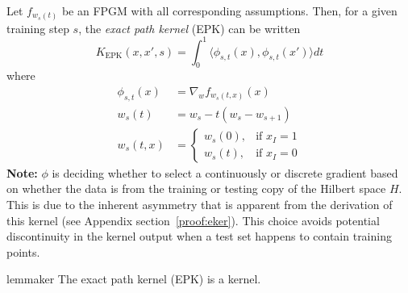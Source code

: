 \begin{definition}
\label{epk}

Let $f_{w_s(t)}$ be an FPGM with all corresponding assumptions. Then, for a given training step $s$, the \emph{exact path kernel} (EPK) can be written  
\begin{equation}
 K_{\text{EPK}}(x, x', s) = \int_0^1\langle \phi_{s,t}(x), \phi_{s,t}(x')\rangle dt
 \label{eq2}
\end{equation}
where
\begin{align}
\phi_{s, t}(x) &=  \nabla_w f_{w_s(t,x)} (x)\\
w_s(t) &= w_s - t(w_s - w_{s+1})\\
w_s(t,x) &= \begin{cases} w_s(0), & \text{if } x_I = 1\\ w_s(t), & \text{if } x_I = 0 \end{cases}
\end{align}
\textbf{Note:} $\phi$ is deciding whether to select a continuously or discrete gradient based on whether the data is from the training or testing copy of the Hilbert space $H$. This is due to the inherent asymmetry that is apparent from the derivation of this kernel (see Appendix section~\ref{proof:eker}). This choice avoids potential discontinuity in the kernel output when a test set happens to contain training points. 
\end{definition}
\begin{restatable}{lemma}{ker}
The exact path kernel (EPK) is a kernel.
\end{restatable}



